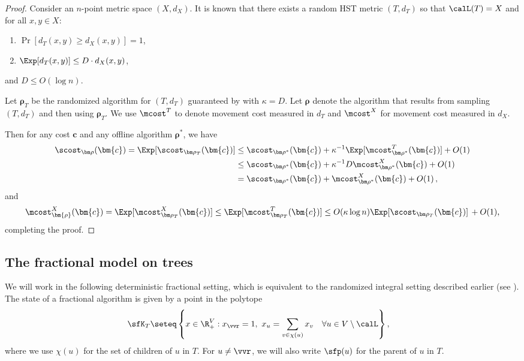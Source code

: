 \begin{proof}
	Consider an $n$-point metric space $(X,d_X)$.  It is known \cite{FRT04} that there
	exists a random HST metric $(T,d_T)$ so that $\calL(T)=X$ and for all $x,y \in X$:
	\begin{enumerate}
		\item $\Pr[d_T(x,y) \geq d_X(x,y)]=1$,
		\item $\Exp[d_T(x,y)] \leq D\cdot d_X(x,y)$,
	\end{enumerate}
	and $D \leq O(\log n)$.
	
	Let $\bm\rho_T$ be the randomized algorithm for $(T,d_T)$ guaranteed by  with $\kappa=D$.
	Let $\bm\rho$ denote the algorithm that results from sampling $(T,d_T)$ and then using $\bm\rho_T$.
	We use $\mcost^T$ to denote movement cost measured in $d_T$ and $\mcost^X$ for movement cost measured in $d_X$.
	
	Then for any cost $\bm{c}$ and any offline algorithm $\bm\rho^*$, we have
	\begin{align*}
	\scost_{\bm\rho}(\bm{c})  = \Exp[\scost_{\bm\rho_T}(\bm{c})] &\leq \scost_{\bm\rho^*}(\bm{c}) + \kappa^{-1} \Exp[\mcost^T_{\bm\rho^*}(\bm{c})] + O(1)\\
	&\leq \scost_{\bm\rho^*}(\bm{c}) + \kappa^{-1} D \mcost^X_{\bm\rho^*}(\bm{c}) + O(1) \\
	&= \scost_{\bm\rho^*}(\bm{c}) + \mcost^X_{\bm\rho^*}(\bm{c}) + O(1)\,,
	\end{align*}
	and
	\begin{align*}
	\mcost_{\bm{\rho}}^X(\bm{c}) = \Exp[\mcost^X_{\bm\rho_T}(\bm{c})] \leq \Exp[\mcost^T_{\bm\rho_T}(\bm{c})] \leq O(\kappa \log n) \Exp[\scost_{\bm\rho_T}(\bm{c})]\,+ O(1),
	\end{align*}
	completing the proof.
\end{proof}

\subsection{The fractional model on trees}

We will work in the following deterministic fractional setting, which is equivalent to the randomized integral setting described earlier (see \cite[\S 2]{BCLL19}). The state of a fractional algorithm is given by a point in the polytope
\begin{align}\label{eq:mtsK}
\sfK_T &\seteq \left\{ x \in \R_+^{V} : x_{\vvr} = 1,\ x_u = \sum_{v \in \chi(u)} x_v \quad \forall u \in V \setminus \calL\right\},
\end{align}
where we use $\chi(u)$ for the set of children of $u$ in $T$. For $u \ne\vvr$, we will also write $\sfp(u)$ for the parent of $u$ in $T$.

